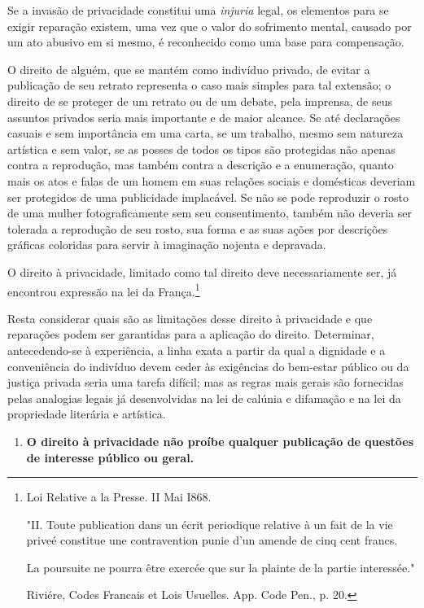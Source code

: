 Se a invasão de privacidade constitui uma \emph{injuria} legal, os
elementos para se exigir reparação existem, uma vez que o valor do
sofrimento mental, causado por um ato abusivo em si mesmo, é reconhecido
como uma base para compensação.

O direito de alguém, que se mantém como indivíduo privado, de evitar a
publicação de seu retrato representa o caso mais simples para tal
extensão; o direito de se proteger de um retrato ou de um debate, pela
imprensa, de seus assuntos privados seria mais importante e de maior
alcance. Se até declarações casuais e sem importância em uma carta, se
um trabalho, mesmo sem natureza artística e sem valor, se as posses de
todos os tipos são protegidas não apenas contra a reprodução, mas também
contra a descrição e a enumeração, quanto mais os atos e falas de um
homem em suas relações sociais e domésticas deveriam ser protegidos de
uma publicidade implacável. Se não se pode reproduzir o rosto de uma
mulher fotograficamente sem seu consentimento, também não deveria ser
tolerada a reprodução de seu rosto, sua forma e as suas ações por
descrições gráficas coloridas para servir à imaginação nojenta e
depravada.

O direito à privacidade, limitado como tal direito deve necessariamente
ser, já encontrou expressão na lei da França.\footnote{Loi Relative a la
  Presse. II Mai I868.

  "II. Toute publication dans un écrit periodique relative à un fait de
  la vie priveé constitue une contravention punie d'un amende de cinq
  cent francs.

  La poursuite ne pourra être exercée que sur la plainte de la partie
  interessée."

  Riviére, Codes Francais et Lois Usuelles. App. Code Pen., p. 20.}

Resta considerar quais são as limitações desse direito à privacidade e
que reparações podem ser garantidas para a aplicação do direito.
Determinar, antecedendo-se à experiência, a linha exata a partir da qual
a dignidade e a conveniência do indivíduo devem ceder às exigências do
bem-estar público ou da justiça privada seria uma tarefa difícil; mas as
regras mais gerais são fornecidas pelas analogias legais já
desenvolvidas na lei de calúnia e difamação e na lei da propriedade
literária e artística.

\begin{enumerate}
\def\labelenumi{\arabic{enumi}.}
\item
  \textbf{O direito à privacidade não proíbe qualquer publicação de
  questões de interesse público ou geral.}
\end{enumerate}

